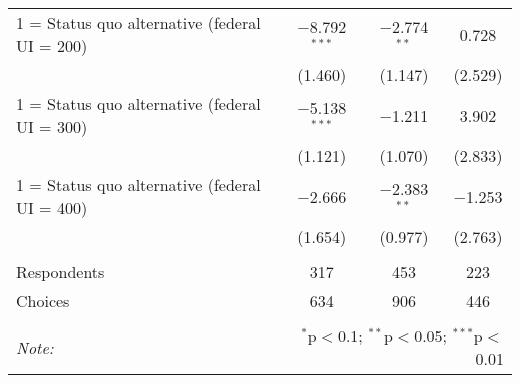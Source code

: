 \begin{table}[!htbp]
\begin{tabular}{@{\extracolsep{5pt}}lccc}
  1 = Status quo alternative (federal UI = 200) & $-$8.792$^{***}$ & $-$2.774$^{**}$ & 0.728 \\ 
  & (1.460) & (1.147) & (2.529) \\ 
  1 = Status quo alternative (federal UI = 300) & $-$5.138$^{***}$ & $-$1.211 & 3.902 \\ 
  & (1.121) & (1.070) & (2.833) \\ 
  1 = Status quo alternative (federal UI = 400) & $-$2.666 & $-$2.383$^{**}$ & $-$1.253 \\ 
  & (1.654) & (0.977) & (2.763) \\ 
 \hline \\[-1.8ex] 
Respondents & 317 & 453 & 223\\ 
 Choices & 634 & 906 & 446\\ 
\hline 
\hline \\[-1.8ex] 
\textit{Note:}  & \multicolumn{3}{r}{$^{*}$p$<$0.1; $^{**}$p$<$0.05; $^{***}$p$<$0.01} \\ 
\end{tabular} 
\end{table} 
